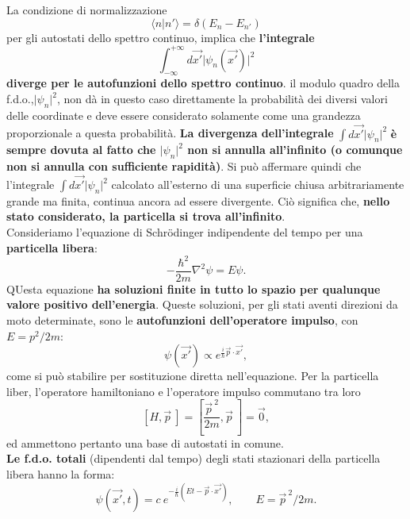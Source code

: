 \documentclass[a4paper,12pt,oneside]{book}
\begin{document}
La condizione di normalizzazione
\begin{equation}
\langle n \vert n' \rangle = \delta (E_n - E_{n'})
\end{equation}
per gli autostati dello spettro continuo, implica che \textbf{l'integrale}
\begin{equation}
\int _{- \infty} ^{+\infty} d\vec{x'} \vert \psi _n (\vec{x'}) \vert ^2
\end{equation}
\textbf{diverge per le autofunzioni dello spettro continuo}.
il modulo quadro della f.d.o.,$\vert \psi _n \vert ^2 $, non dà in questo caso direttamente la probabilità dei diversi valori delle coordinate e deve essere considerato solamente come una grandezza proporzionale a questa probabilità. \textbf{La divergenza dell'integrale} $ \int  d\vec{x'} \vert \psi _n  \vert ^2$ \textbf{è sempre dovuta al fatto che $\vert \psi _n  \vert ^2$ non si annulla all'infinito (o comunque non si annulla con sufficiente rapidità)}. Si può affermare quindi che l'integrale $ \int  d\vec{x'} \vert \psi _n  \vert ^2$ calcolato all'esterno di una superficie chiusa arbitrariamente grande ma finita, continua ancora ad essere divergente. Ciò significa che, \textbf{nello stato considerato, la particella si trova all'infinito}.\\
Consideriamo l'equazione di Schr\"{o}dinger indipendente del tempo per una \textbf{particella libera}:
\begin{equation}
-\frac{\hbar ^2}{2m}\nabla ^2 \psi = E\psi.
\end{equation}
QUesta equazione \textbf{ha soluzioni finite in tutto lo spazio per qualunque valore positivo dell'energia}. Queste soluzioni, per gli stati aventi direzioni da moto determinate, sono le \textbf{autofunzioni dell'operatore impulso}, con $E= p^2/2m$:
\begin{equation}
\psi (\vec{x'}) \propto e ^{\frac{i}{\hbar}\vec{p}\cdot \vec{x'}},
\end{equation}
come si può stabilire per sostituzione diretta nell'equazione. Per la particella liber, l'operatore hamiltoniano e l'operatore impulso commutano tra loro
\begin{equation}
\left[ H, \vec{p}\ \right] = \left[ \frac{ {\vec{p}}^{\ 2}}{2m}, \vec{p}\ \right] =\vec{0},
\end{equation}
ed ammettono pertanto una base di autostati in comune.\\
\textbf{Le f.d.o. totali} (dipendenti dal tempo) degli stati stazionari della particella libera hanno la forma:
\begin{equation}
\psi (\vec{x'}, t) = c\ e^{-\frac{i}{\hbar} (Et - \vec{p}\cdot \vec{x'})}, \qquad E={\vec{p}}^{\ 2}/{2m}.
\label{eq:cap8_6}
\end{equation}
\end{document}
